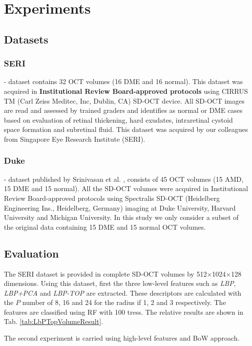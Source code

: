 
\section{Experiments}
\subsection{Datasets}
\subsubsection{SERI} - dataset contains 32 OCT volumes (16 DME and 16 normal). This dataset was acquired in \textbf{Institutional Review Board-approved protocols} using CIRRUS TM (Carl Zeiss Meditec, Inc, Dublin, CA) SD-OCT device. All SD-OCT images are read and assessed by trained graders and identifies as normal or DME cases based on evaluation of retinal thickening, hard exudates, intraretinal cystoid space formation and subretinal fluid. This dataset was acquired by our colleagues from Singapore Eye Research Institute (SERI). 

\subsubsection{Duke} - dataset published by Srinivasan et al. \cite{Srinivasan2014}, consists of 45 OCT volumes (15 AMD, 15 DME and 15 normal). All the SD-OCT volumes were acquired in Institutional Review Board-approved protocols using Spectralis SD-OCT (Heidelberg Engineering Ins., Heidelberg, Germany) imaging at Duke University, Harvard University and Michigan University. In this study we only consider a subset of the original data containing 15 DME and 15 normal OCT volumes.

\subsection{Evaluation}
The SERI dataset is provided in complete SD-OCT volumes by 512$\times$1024$\times$128 dimensions. Using this dataset, first the three low-level features such as \textit{LBP}, \textit{LBP+PCA} and \textit{LBP-TOP} are extracted. These descriptors are calculated with the $P$ number of 8, 16 and 24 for the radius if 1, 2 and 3 respectively. The features are classified using RF with 100 tress. The relative results are shown in Tab. \ref{tab:LbPTopVolumeResult}. 

The second experiment is carried using high-level features and BoW approach.  

